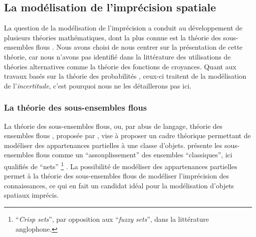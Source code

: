 \subsection{La modélisation de l'imprécision spatiale}

La question de la modélisation de l’imprécision a conduit au
développement de plusieurs théories mathématiques, dont la plus connue
est la théorie des sous-ensembles flous \autocite{Zadeh1965}. Nous
avons choisi de nous centrer sur la présentation de cette théorie, car
nous n’avons pas identifié dans la littérature des utilisations de
théories alternatives comme la théorie des fonctions de
croyances. Quant aux travaux basés sur la théorie des probabilités
\autocite{Tossebro2002,Tossebro2008}, ceux-ci traitent de la
modélisation de l’\emph{incertitude}, c’est pourquoi nous ne les
détaillerons pas ici.






\subsubsection{La théorie des sous-ensembles flous}
\label{subsec:theorie_flou}

La théorie des sous-ensembles flous, ou, par abus de langage, théorie
des ensembles flous \autocite{Bouchon-Meunier2007}, proposée par
\textcite{Zadeh1965}, vise à proposer un cadre théorique permettant de
modéliser des appartenances partielles à une classe
d’objets. \textcite{Bouchon-Meunier1995} présente les sous-ensembles
flous comme un \enquote{assouplissement} des ensembles
\enquote{classiques}, ici qualifiés de \enquote{nets}
\footnote{\foreignquote{english}{\emph{Crisp sets}}, par opposition
  aux \foreignquote{english}{\emph{fuzzy sets}}, dans la littérature
  anglophone.} \autocite{Smithson2006}. La possibilité de modéliser
des appartenances partielles permet à la théorie des sous-ensembles
flous de modéliser l’imprécision des connaissances, ce qui en fait un
candidat idéal pour la modélisation d’objets spatiaux imprécis.

